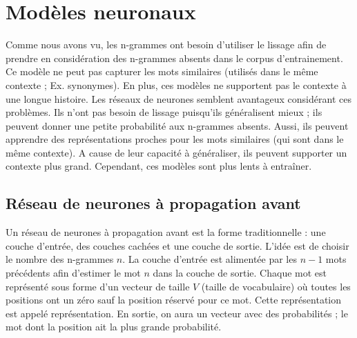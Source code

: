 \documentclass{KodeBook}
\begin{document}
\section{Modèles neuronaux}

Comme nous avons vu, les n-grammes ont besoin d'utiliser le lissage afin de prendre en considération des n-grammes absents dans le corpus d'entrainement. 
Ce modèle ne peut pas capturer les mots similaires (utilisés dans le même contexte ; Ex. synonymes). 
En plus, ces modèles ne supportent pas le contexte à une longue histoire. 
Les réseaux de neurones semblent avantageux considérant ces problèmes. 
Ils n'ont pas besoin de lissage puisqu'ils généralisent mieux ; ils peuvent donner une petite probabilité aux n-grammes absents. 
Aussi, ils peuvent apprendre des représentations proches pour les mots similaires (qui sont dans le  même contexte). 
A cause de leur capacité à généraliser, ils peuvent supporter un contexte plus grand. 
Cependant, ces modèles sont plus lents à entraîner.

\subsection{Réseau de neurones à propagation avant}

Un réseau de neurones à propagation avant est la forme traditionnelle : une couche d'entrée, des couches cachées et une couche de sortie. 
L'idée est de choisir le nombre des n-grammes $n$. 
La couche d'entrée est alimentée par les $n-1$ mots précédents afin d'estimer le mot $n$ dans la couche de sortie. 
Chaque mot est représenté sous forme d'un vecteur de taille $V$ (taille de vocabulaire) où toutes les positions ont un zéro sauf la position réservé pour ce mot. 
Cette représentation est appelé  représentation. 
En sortie, on aura un vecteur avec des probabilités ; le mot dont la position ait la plus grande probabilité. 
\end{document}
